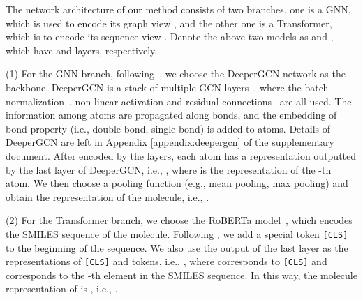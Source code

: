 \documentclass{article}
\begin{document}
The network architecture of our method consists of two branches, one is a GNN, which is used to encode its graph view , and the other one is a Transformer, which is to encode its sequence view . Denote the above two models as  and , which have  and  layers, respectively.

\noindent(1) For the GNN branch, following~\cite{li2020deepergcn}, we choose the DeeperGCN network as the backbone. DeeperGCN is a stack of multiple GCN layers~\cite{kipf2016semi}, where the batch normalization~\cite{ioffe2015batch}, non-linear activation and residual connections~\cite{he2016deep} are all used. The information among atoms are propagated along bonds, and the embedding of bond property (i.e., double bond, single bond) is added to atoms. Details of DeeperGCN are left in Appendix \ref{appendix:deepergcn} of the supplementary document. After encoded by the  layers, each atom has a representation outputted by the last layer of DeeperGCN, i.e., , where  is the representation of the -th atom. We then choose a pooling function  (e.g., mean pooling, max pooling) and obtain the representation of the molecule, i.e., . 

\noindent(2) For the Transformer branch, we choose the RoBERTa model~\cite{liu2019roberta}, which encodes the SMILES sequence  of the molecule. Following \cite{liu2019roberta,devlin2018bert}, we add a special token \texttt{[CLS]} to the beginning of the sequence. We also use the output of the last layer as the representations of \texttt{[CLS]} and tokens, i.e., , where  corresponds to \texttt{[CLS]} and  corresponds to the -th element in the SMILES sequence. In this way, the molecule representation of  is , i.e., .





\iffalse
For a fair comparison, we use the similar backbone architecture for each branch without much modification. Specifically, for Transformer branch, we use the same architecture as RoBERTa \cite{liu2019roberta}, consisting of  layer of Transformer encoder \cite{vaswani2017attention}, to map , a sequence of discrete tokens into a sequence of continuous representation . Following prior work, we append a \texttt{[CLS]} token to represent the sequence representation  when pre-training and finetuning . For GNN branch, to match the depth of Transformer branch, following DeeperGCN \cite{li2020deepergcn}, we stack the same  layer of GNN block by introducing the residual connection. The GNN transforms the graph view , consisting of atoms and bonds into a set of node embeddings . Last, we pool the node embeddings to get graph embedding . 
\fi
\end{document}
